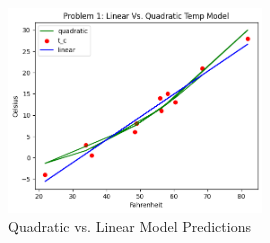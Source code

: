 \documentclass{article}
\begin{document}
\begin{enumerate}[label=\alph*. ]
    \begin{figure}[htbp]
        \centering
        \includegraphics[width=0.6\textwidth]{images/im1.png}
        \caption{Quadratic vs. Linear Model Predictions}
        \label{fig:quad_vs_linear}
    \end{figure}
\end{enumerate}
\newpage
\end{document}
